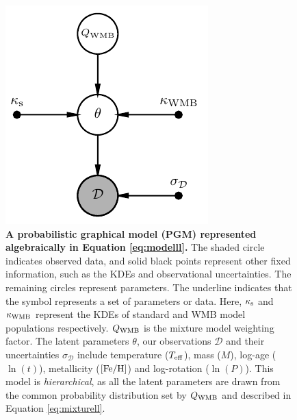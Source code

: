 \documentclass[12pt]{article}
\newcommand{\teff}{\mbox{$T_{\rm eff}$}\xspace}
\newcommand{\feh}{\mbox{$\rm{[Fe/H]}$}\xspace}
\begin{document}
\renewcommand{\figurename}{Extended Data Figure}


\setcounter{figure}{0}    
\begin{figure}[h!]
	\centering
	\includegraphics[width=0.6 \textwidth]{pgm_models.pdf}
	\caption{\textbf{A probabilistic graphical model (PGM) represented algebraically in Equation \ref{eq:modelll}.} The shaded circle indicates observed data, and solid black points represent other fixed information, such as the KDEs and observational uncertainties. The remaining circles represent parameters. The underline indicates that the symbol represents a set of parameters or data. Here, $\kappa_{\rm{s}}$ and $\kappa_{\rm WMB}$ represent the KDEs of standard and WMB model populations respectively. $Q_{\rm{WMB}}$ is the mixture model weighting factor. The latent parameters $\theta$, our observations $\mathcal{D}$ and their uncertainties $\sigma_{\mathcal{D}}$ include temperature (\teff), mass ($M$), log-age ($\ln(t)$), metallicity (\feh) and log-rotation ($\ln(P)$). This model is \textit{hierarchical}, as all the latent parameters are drawn from the common probability distribution set by $Q_{\rm{WMB}}$ and described in Equation \ref{eq:mixturell}.}
	\label{fig:pgm}
\end{figure}

\clearpage


\end{document}
